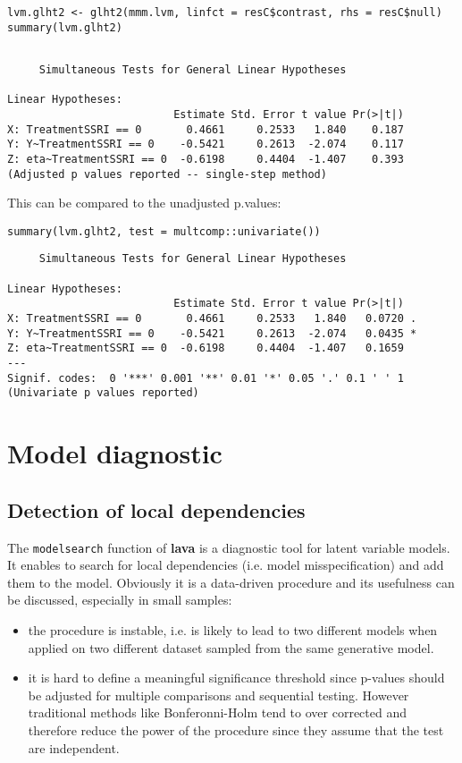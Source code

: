 \documentclass[12pt]{article}
\begin{document}
\lstset{language=r,label= ,caption= ,captionpos=b,numbers=none}
\begin{lstlisting}
lvm.glht2 <- glht2(mmm.lvm, linfct = resC$contrast, rhs = resC$null)
summary(lvm.glht2)
\end{lstlisting}

\begin{verbatim}

	 Simultaneous Tests for General Linear Hypotheses

Linear Hypotheses:
                          Estimate Std. Error t value Pr(>|t|)
X: TreatmentSSRI == 0       0.4661     0.2533   1.840    0.187
Y: Y~TreatmentSSRI == 0    -0.5421     0.2613  -2.074    0.117
Z: eta~TreatmentSSRI == 0  -0.6198     0.4404  -1.407    0.393
(Adjusted p values reported -- single-step method)
\end{verbatim}

This can be compared to the unadjusted p.values:
\lstset{language=r,label= ,caption= ,captionpos=b,numbers=none}
\begin{lstlisting}
summary(lvm.glht2, test = multcomp::univariate())
\end{lstlisting}

\begin{verbatim}
	 Simultaneous Tests for General Linear Hypotheses

Linear Hypotheses:
                          Estimate Std. Error t value Pr(>|t|)  
X: TreatmentSSRI == 0       0.4661     0.2533   1.840   0.0720 .
Y: Y~TreatmentSSRI == 0    -0.5421     0.2613  -2.074   0.0435 *
Z: eta~TreatmentSSRI == 0  -0.6198     0.4404  -1.407   0.1659  
---
Signif. codes:  0 '***' 0.001 '**' 0.01 '*' 0.05 '.' 0.1 ' ' 1
(Univariate p values reported)
\end{verbatim}


\clearpage 
\section{Model diagnostic}
\label{sec:org41ca886}
\subsection{Detection of local dependencies}
\label{sec:org8e05d8d}

The \texttt{modelsearch} function of \textbf{lava} is a diagnostic tool for latent
variable models. It enables to search for local dependencies
(i.e. model misspecification) and add them to the model. Obviously it
is a data-driven procedure and its usefulness can be discussed,
especially in small samples:
\begin{itemize}
\item the procedure is instable, i.e. is likely to lead to two different
models when applied on two different dataset sampled from the same
generative model.
\item it is hard to define a meaningful significance threshold since
p-values should be adjusted for multiple comparisons and sequential
testing. However traditional methods like Bonferonni-Holm tend to
over corrected and therefore reduce the power of the procedure since
they assume that the test are independent.
\end{itemize}
\end{document}
